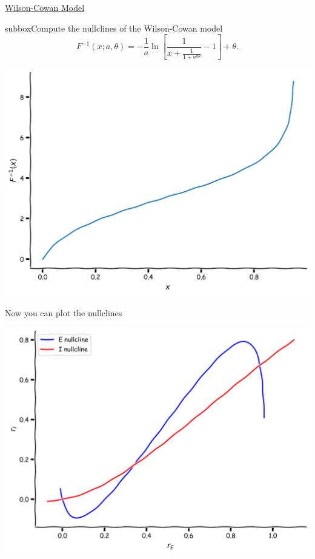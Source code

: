 \begin{textbox}{\href{https://compneuro.neuromatch.io/tutorials/W2D4_DynamicNetworks/chapter_title.html}{Wilson-Cowan Model } }
\begin{subbox}{subbox}{Compute the nullclines of the Wilson-Cowan model}
$$
F^{-1}(x; a, \theta) = -\frac{1}{a} \ln \left[ \frac{1}{x + \displaystyle \frac{1}{1+\text{e}^{a\theta}}} - 1 \right] + \theta.
$$
\begin{center}
\includegraphics[scale=0.15]{Figures/DN/DN_Figure8.png}
\end{center}
Now you can plot the nullclines
\begin{center}
\includegraphics[scale=0.15]{Figures/DN/DN_Figure9.png}
\end{center}

\end{subbox}
\end{textbox}
